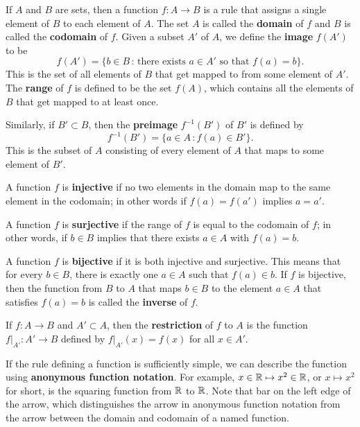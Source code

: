 \documentclass[svgnames]{report}
\begin{document}
\begin{tcolorbox}[title = Functions, breakable, parbox = false, colframe = MidnightBlue, colback=softblue] 
If $A$ and $B$ are sets, then a function $f:A \to B$ is a rule that assigns a single element of $B$ to each element of $A$. The set $A$ is called the \textbf{domain} of $f$ and $B$ is called the \textbf{codomain} of $f$. Given a subset $A'$ of  $A$, we define the \textbf{image} $f(A')$ to be 
\begin{equation} \label{eq:image} 
f(A') = \{b \in B \, : \, \text{there exists }a \in A' \text{ so that } f(a) = b\}. 
\end{equation} 
This is the set of all elements of $B$ that get mapped to from some element of $A'$. The \textbf{range} of $f$ is defined to be the set $f(A)$, which contains all the elements of $B$ that get mapped to at least once. 

Similarly, if $B'\subset B$, then the \textbf{preimage} $f^{-1}(B')$ of $B'$ is defined by 
\[
f^{-1}(B') = \{a \in A \, : f(a) \in B'\}. 
\]
This is the subset of $A$ consisting of every element of $A$ that maps to some element of $B'$. 

A function $f$ is \textbf{injective} if no two elements in the domain map to the same element in the codomain; in other words if $f(a) = f(a')$ implies $a=a'$. 

A function $f$ is \textbf{surjective} if the range of $f$ is equal to the codomain of $f$; in other words, if $b \in B$ implies that there exists $a\in A$ with $f(a) = b$. 

A function $f$ is \textbf{bijective} if it is both injective and
surjective. This means that for every $b\in B$, there is exactly one
$a\in A$ such that $f(a) \in b$. If $f$ is bijective, then the
function from $B$ to $A$ that maps $b\in B$ to the element $a \in A$
that satisfies $f(a) = b$ is called the \textbf{inverse} of $f$.

If $f: A \to B$ and $A' \subset A$, then the \textbf{restriction} of
$f$ to $A$ is the function $\left. f \right|_{A'} : A' \to B$ defined
by $\left. f \right|_{A'}(x) = f(x)$ for all $x \in A'$. 

If the rule defining a function is sufficiently simple, we can
describe the function using \textbf{anonymous function notation}. For
example, $x \in \mathbb{R}\mapsto x^2 \in \mathbb{R}$, or $x\mapsto x^2$ for short, is
the squaring function from $\mathbb{R}$ to $\mathbb{R}$. Note that bar on the left
edge of the arrow, which distinguishes the arrow in anonymous function
notation from the arrow between the domain and codomain of a named
function.
\end{tcolorbox}
\end{document}
